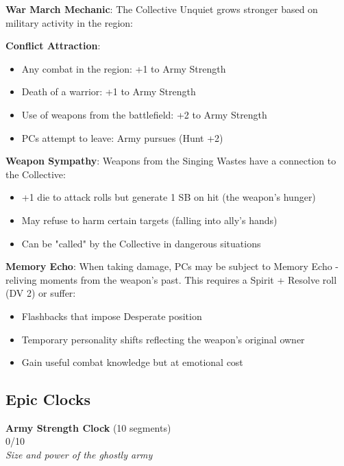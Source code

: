 \documentclass[11pt]{article}
\newcommand{\clocksegment}{\textbullet}
\begin{document}
\begin{mdframed}[backgroundcolor=mechanicbg]
\textbf{War March Mechanic}: The Collective Unquiet grows stronger based on military activity in the region:

\textbf{Conflict Attraction}: 
\begin{itemize}[leftmargin=*]
\item Any combat in the region: +1 to Army Strength
\item Death of a warrior: +1 to Army Strength
\item Use of weapons from the battlefield: +2 to Army Strength
\item PCs attempt to leave: Army pursues (Hunt +2)
\end{itemize}

\textbf{Weapon Sympathy}: Weapons from the Singing Wastes have a connection to the Collective:
\begin{itemize}[leftmargin=*]
\item +1 die to attack rolls but generate 1 SB on hit (the weapon's hunger)
\item May refuse to harm certain targets (falling into ally's hands)
\item Can be "called" by the Collective in dangerous situations
\end{itemize}

\textbf{Memory Echo}: When taking damage, PCs may be subject to Memory Echo - reliving moments from the weapon's past. This requires a Spirit + Resolve roll (DV 2) or suffer:
\begin{itemize}[leftmargin=*]
\item Flashbacks that impose Desperate position
\item Temporary personality shifts reflecting the weapon's original owner
\item Gain useful combat knowledge but at emotional cost
\end{itemize}
\end{mdframed}

\subsection*{Epic Clocks}

\begin{center}
\textbf{Army Strength Clock} (10 segments)\\
\fbox{\clocksegment\clocksegment\clocksegment\clocksegment\clocksegment\clocksegment\clocksegment\clocksegment\clocksegment\clocksegment} 0/10\\
\textit{Size and power of the ghostly army}
\end{center}
\end{document}
